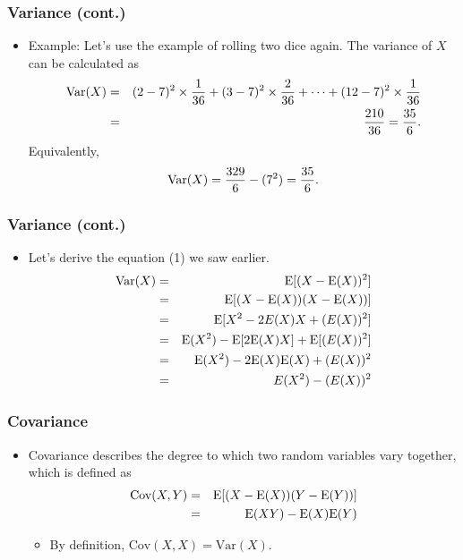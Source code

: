 \documentclass[pdflatex, 12pt]{beamer}
\begin{document}
\begin{frame}
\frametitle{Variance (cont.)}
\begin{itemize}
\item Example: Let's use the example of rolling two dice again. The variance of $X$ can be calculated as
 {\small
 \begin{eqnarray}
 \mathrm{Var}(X) &=& (2 - 7)^2 \times \frac{1}{36} + (3 - 7)^2 \times \frac{2}{36} + \cdots + (12 - 7)^2 \times \frac{1}{36} \notag \\
 &=& \frac{210}{36} = \frac{35}{6}. \notag 
 \end{eqnarray}
 }
Equivalently,
 \begin{equation}
 \mathrm{Var}(X) = \frac{329}{6} - (7^2) = \frac{35}{6}. \notag 
 \end{equation}
\end{itemize}
\end{frame}

\begin{frame}
\frametitle{Variance (cont.)}
\begin{itemize}
\item Let's derive the equation (1) we saw earlier. 
 \begin{eqnarray}
 \mathrm{Var}(X) &=& \mathrm{E}[(X - \mathrm{E}(X))^2] \notag \\
 &=& \mathrm{E}[(X - \mathrm{E}(X))(X - \mathrm{E}(X))] \notag \\
 &=& \mathrm{E}[X^2 - 2E(X)X + (E(X))^2] \notag \\
 &=& \mathrm{E}(X^2) - \mathrm{E}[2\mathrm{E}(X)X] + \mathrm{E}[(E(X))^2] \notag \\
 &=& \mathrm{E}(X^2) - 2\mathrm{E}(X)\mathrm{E}(X) + (E(X))^2 \notag \\
 &=& E(X^2) - (E(X))^2 \notag
 \end{eqnarray}
\end{itemize}
\end{frame}

\begin{frame}
\frametitle{Covariance}
\begin{itemize}
\item Covariance describes the degree to which two random variables vary together, which is defined as
 \begin{eqnarray}
 \mathrm{Cov}(X, Y) &=& \mathrm{E}[(X - \mathrm{E}(X))(Y - \mathrm{E}(Y))] \notag \\
 &=& \mathrm{E}(XY) - \mathrm{E}(X)\mathrm{E}(Y) \notag 
 \end{eqnarray}
 \begin{itemize}
 \item By definition, $\mathrm{Cov}(X, X) = \mathrm{Var}(X)$.
 \end{itemize}
\end{itemize}
\end{frame}
\end{document}
